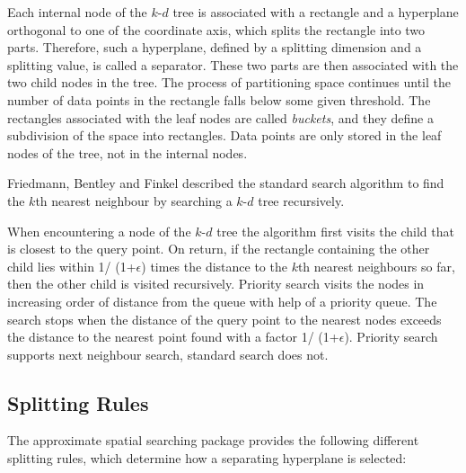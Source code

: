 Each internal node of the $k$-$d$ tree is associated with a rectangle
and a hyperplane orthogonal to
one of the coordinate axis, which splits the rectangle into two parts.
Therefore, such a hyperplane, defined by a splitting dimension
and a splitting value, is called a separator.
These two parts are then associated
with the two child nodes in the tree. The process of partitioning space continues until the number of data
points in the rectangle falls below some given threshold. The rectangles associated with the leaf nodes
are called {\it buckets}, and they define a subdivision of the space into rectangles.
Data points are only stored in the leaf nodes of the tree, not in the internal nodes.

Friedmann, Bentley and Finkel \cite{fbf-afbml-77} described the standard
search algorithm to find the $k$th nearest neighbour by searching a $k$-$d$ tree recursively.

When encountering a node of the $k$-$d$ tree the algorithm first visits the child that is closest
to the query point. On return, if the rectangle containing  the other child lies within
1/ (1+$\epsilon$) times the distance to the $k$th nearest neighbours so far, then
the other child is visited recursively.
Priority search \cite{am-annqf-93} visits the nodes in increasing order of distance from
the queue with help of a priority queue.
The search stops when the distance of the query point to the nearest nodes
exceeds the distance to the nearest point found with a factor 1/ (1+$\epsilon$).
Priority search supports next neighbour search, standard search does not.

\subsection {Splitting Rules}

The approximate spatial searching package provides the following different splitting rules,
which determine how a separating hyperplane is selected:

